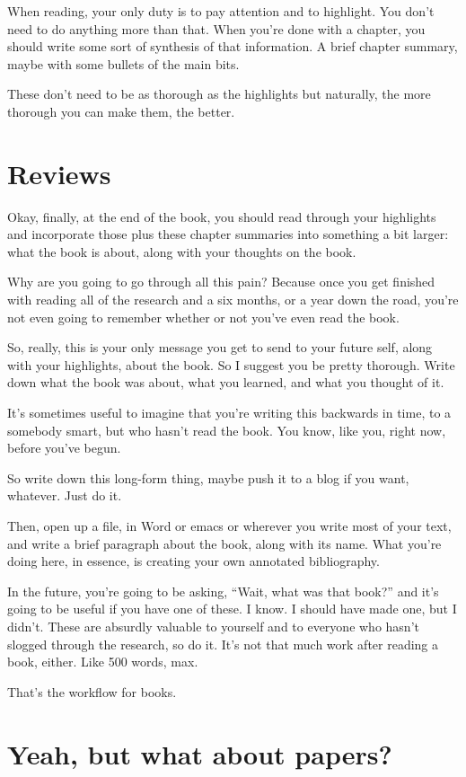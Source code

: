 When reading, your only duty is to pay attention and to highlight. You don't
need to do anything more than that. When you're done with a chapter, you should
write some sort of synthesis of that information. A brief chapter summary, maybe
with some bullets of the main bits.

These don't need to be as thorough as the highlights but naturally, the more
thorough you can make them, the better.

\section{Reviews}

Okay, finally, at the end of the book, you should read through your highlights
and incorporate those plus these chapter
summaries into something a bit larger: what the book is about, along with your
thoughts on the book.

Why are you going to go through all this pain? Because once you get finished
with reading all of the research and a six months, or a year down the road,
you're not even going to remember whether or not you've even read the book.

So, really, this is your only message you get to send to your future self, along
with your highlights, about the book. So I suggest you be pretty
thorough. Write down what the book was about, what you learned, and what you
thought of it.

It's sometimes useful to imagine that you're writing this backwards in time, to
a somebody smart, but who hasn't read the book. You know, like you, right now,
before you've begun.

So write down this long-form thing, maybe push it to a blog if you want,
whatever. Just do it.

Then, open up a file, in Word or emacs or wherever you write most of your text,
and write a brief paragraph about the book, along with its name. What you're
doing here, in essence, is creating your own annotated bibliography.

In the future, you're going to be asking, ``Wait, what was that book?'' and it's
going to be useful if you have one of these. I know. I should have made one, but
I didn't. These are absurdly valuable to yourself and to everyone who hasn't
slogged through the research, so do it. It's not that much work after reading a
book, either. Like 500 words, max.

That's the workflow for books.

\section{Yeah, but what about papers?}

